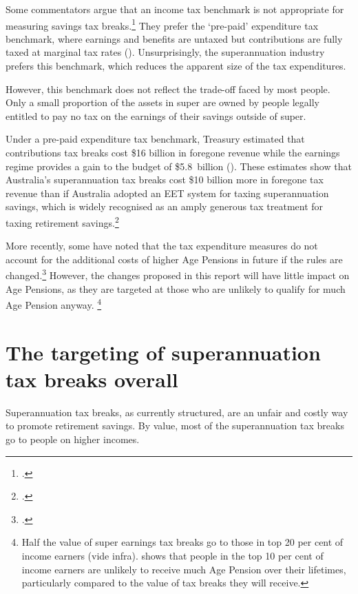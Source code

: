 \documentclass{grattanAlpha}
\begin{document}
Some commentators argue that an income tax benchmark is not appropriate for measuring savings tax breaks.\footcites{Carling2015}{Sloan2015} They prefer the ‘pre-paid’ expenditure tax benchmark, where earnings and benefits are untaxed but contributions are fully taxed at marginal tax rates (). Unsurprisingly, the superannuation industry prefers this benchmark, which reduces the apparent size of the tax expenditures. 

However, this benchmark does not reflect the trade-off faced by most people. Only a small proportion of the assets in super are owned by people legally entitled to pay no tax on the earnings of their savings outside of super. 

Under a pre-paid expenditure tax benchmark, Treasury estimated that contributions tax breaks cost \$16 billion in foregone revenue while the earnings regime provides a gain to the budget of \$5.8~billion (\textcite{Treasury2014TES2013}). These estimates show that Australia’s superannuation tax breaks cost \$10 billion more in foregone tax revenue than if Australia adopted an EET system for taxing superannuation savings, which is widely recognised as an amply generous tax treatment for taxing retirement savings.\footcites{MaddockKing2015}{Freebairn2015}

More recently, some have noted that the tax expenditure measures do not account for the additional costs of higher Age Pensions in future if the rules are changed.\footcites[][5--6]{Mercer2013a}[][13--14]{FSC2015}[][3]{Clare2015}
However, the changes proposed in this report will have little impact on Age Pensions, as they are targeted at those who are unlikely to qualify for much Age Pension anyway.%
\footnote{Half the value of super earnings tax breaks go to those in top 20 per cent of income earners (vide  {infra}).   shows that people in the top 10 per cent of income earners are unlikely to receive much Age Pension over their lifetimes, particularly compared to the value of tax breaks they will receive.}  



\chapter{The targeting of superannuation tax breaks overall}
Superannuation tax breaks, as currently structured, are an unfair and costly way to promote retirement savings. By value, most of the superannuation tax breaks go to people on higher incomes. 
\end{document}
